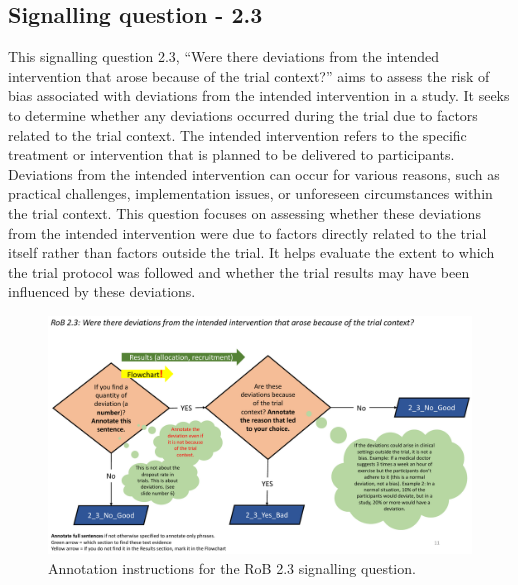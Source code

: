 \documentclass[sn-mathphys,Numbered]{sn-jnl}%
\begin{document}
\subsection*{Signalling question - 2.3}
\label{subsec:2_3}
%
This signalling question 2.3, ``Were there deviations from the intended intervention that arose because of the trial context?'' aims to assess the risk of bias associated with deviations from the intended intervention in a study.
It seeks to determine whether any deviations occurred during the trial due to factors related to the trial context.
The intended intervention refers to the specific treatment or intervention that is planned to be delivered to participants.
Deviations from the intended intervention can occur for various reasons, such as practical challenges, implementation issues, or unforeseen circumstances within the trial context.
This question focuses on assessing whether these deviations from the intended intervention were due to factors directly related to the trial itself rather than factors outside the trial.
It helps evaluate the extent to which the trial protocol was followed and whether the trial results may have been influenced by these deviations.

%
%
%
\begin{figure}[hbt]
    \centering
    \includegraphics[width=\textwidth]{figures/2_3.pdf}
    \caption{Annotation instructions for the RoB 2.3 signalling question.}
    \label{fig:2_3}
\end{figure}
%
%
%
\end{document}
